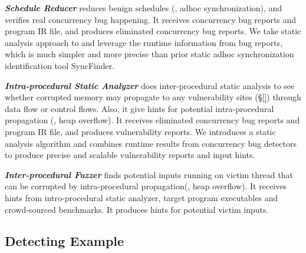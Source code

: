 \emph{\textbf{Schedule Reducer}} reduces benign schedules (\eg, adhoc synchronization), and verifies real concurrency bug happening.  
It receives concurrency bug reports and program IR file, and produces eliminated concurrency bug reports. 
We take static analysis approach to and leverage the runtime information from bug reports, 
which is much simpler and more precise than prior static adhoc synchronization identification tool SyncFinder\cite{syncfinder:osdi10}.

\emph{\textbf{Intra-procedural Static Analyzer}} does inter-procedural static analysis to 
see whether corrupted memory may propagate to 
any vulnerability sites (\S\ref{}) through data flow or control flows. 
Also, it give hints for potential intra-procedural propagation (\eg, heap overflow). 
It receives eliminated concurrency bug reports and program IR file, and produces vulnerability reports.  
We introduces a static analysis algorithm and combines runtime results from concurrency bug detectors to produce  
precise and scalable vulnerability reports and input hints. 

\emph{\textbf{Inter-procedural Fuzzer}} finds potential inputs running on victim thread 
that can be corrupted by intra-procedural propagation(\eg, heap overflow). It receives 
hints from intro-procedural static analyzer, target program executables and crowd-sourced 
benchmarks. It produces hints for potential victim inputs. 
   
  

  

\subsection{Detecting Example}\label{sec:example}

